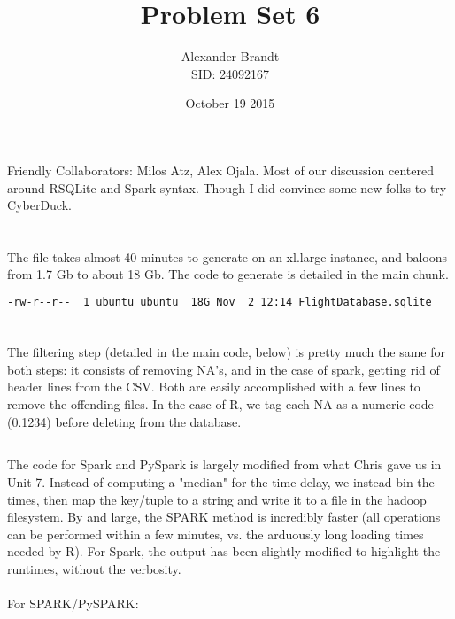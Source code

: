 \documentclass{article}\usepackage[]{graphicx}\usepackage[]{color}
\title{Problem Set 6}
\author{Alexander Brandt\\SID: 24092167}
\date{October 19 2015}
\begin{document}
\maketitle

Friendly Collaborators: Milos Atz, Alex Ojala.  Most of our discussion centered around RSQLite and Spark syntax.  Though I did convince some new folks to try CyberDuck.

\section{}

The file takes almost 40 minutes to generate on an xl.large instance, and baloons from 1.7 Gb to about 18 Gb.  The code to generate is detailed in the main chunk. \\

\begin{lstlisting}[language=bash,caption={ls results}]
-rw-r--r--  1 ubuntu ubuntu  18G Nov  2 12:14 FlightDatabase.sqlite
\end{lstlisting}

\section{}

\subsection{}

The filtering step (detailed in the main code, below) is pretty much the same for both steps: it consists of removing NA's, and in the case of spark, getting rid of header lines from the CSV.  Both are easily accomplished with a few lines to remove the offending files.  In the case of R, we tag each NA as a numeric code (0.1234) before deleting from the database.

\subsection{}

The code for Spark and PySpark is largely modified from what Chris gave us in Unit 7.  Instead of computing a "median" for the time delay, we instead bin the times, then map the key/tuple to a string and write it to a file in the hadoop filesystem.  By and large, the SPARK method is incredibly faster (all operations can be performed within a few minutes, vs. the arduously long loading times needed by R).  For Spark, the output has been slightly modified to highlight the runtimes, without the verbosity.
\\\\
For SPARK/PySPARK:
\end{document}
